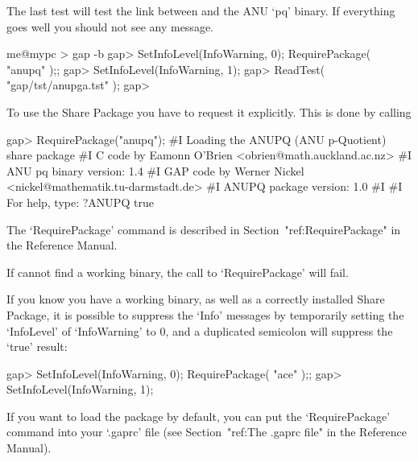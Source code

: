 The last test will test the link between {\GAP} and the ANU `pq'  binary.
If everything goes well you should not see any message.

\begintt
me@mypc > gap -b
gap> SetInfoLevel(InfoWarning, 0); RequirePackage( "anupq" );;
gap> SetInfoLevel(InfoWarning, 1);
gap> ReadTest( "gap/tst/anupga.tst" );
gap>
\endtt


To use the {\ANUPQ} Share Package you have to request it explicitly. This
is done by calling

\beginexample
gap> RequirePackage("anupq");
#I    Loading the ANUPQ (ANU p-Quotient) share package
#I    C code by  Eamonn O'Brien <obrien@math.auckland.ac.nz>
#I                ANU pq binary version: 1.4
#I    GAP code by Werner Nickel <nickel@mathematik.tu-darmstadt.de>
#I                ANUPQ package version: 1.0
#I  
#I                For help, type: ?ANUPQ
true
\endexample

The `RequirePackage' command is described in Section~"ref:RequirePackage"
in the {\GAP} Reference Manual.

If {\GAP} cannot find a working binary, the call to `RequirePackage' will
fail.

If you know you have a working {\ANUPQ} binary, as well  as  a  correctly
installed {\ANUPQ} Share Package, it is possible to suppress  the  `Info'
messages by temporarily setting the `InfoLevel' of  `InfoWarning'  to  0,
and a duplicated semicolon will suppress the `true' result:

\beginexample
gap> SetInfoLevel(InfoWarning, 0); RequirePackage( "ace" );;
gap> SetInfoLevel(InfoWarning, 1);
\endexample

If you want to load the {\ANUPQ} package by  default,  you  can  put  the
`RequirePackage' command into your `.gaprc'  file  (see  Section~"ref:The
.gaprc file" in the {\GAP} Reference Manual).

